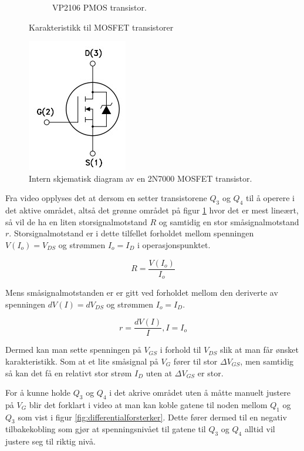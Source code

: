 \begin{figure}[H]
\begin{subfigure}{.5\textwidth}
		\caption{VP2106 PMOS transistor.\cite{supertex_2013_supertex}}
		\label{fig:karakteristikkting2}
	\end{subfigure}
	\caption{Karakteristikk til MOSFET transistorer}
	\label{fig:karakteristikker}
\end{figure}

\begin{figure}[H]
	\centering
	\includegraphics[scale=0.6]{./Images/02Concept/internal.jpg}
	\caption{Intern skjematisk diagram av en 2N7000 MOSFET transistor.\cite{stmicroelectronics_2008_2n7000}}
	\label{fig:internal}
\end{figure}

Fra video \cite{feyling_2022_aktiv} opplyses det at dersom en setter transistorene $Q_3$ og $Q_4$ til å operere i det aktive området, altså det grønne området på figur \ref{fig:karakteristikkting2} hvor det er mest lineært, så vil de ha en liten storsignalmotstand $R$ og samtidig en stor småsignalmotstand $r$. Storsignalmotstand er i dette tilfellet forholdet mellom spenningen $V(I_o)=V_{DS}$ og strømmen $I_o=I_D$ i operasjonspunktet.

\begin{equation}
	R=\frac{V(I_o)}{I_o}
\end{equation}

Mens småsignalmotstanden er er gitt ved forholdet mellom den deriverte av spenningen $dV(I)=dV_{DS}$ og strømmen $I_o=I_D$.

\begin{equation}
	r=\frac{dV(I)}{I}, I=I_o
\end{equation}

Dermed kan man sette spenningen på $V_{GS}$ i forhold til $V_{DS}$ slik at man får ønsket karakteristikk. Som at et lite småsignal på $V_G$ fører til stor $\Delta V_{GS}$, men samtidig så kan det få en relativt stor strøm $I_D$ uten at $\Delta V_{GS}$ er stor.


For å kunne holde $Q_3$ og $Q_4$ i det akrive området uten å måtte manuelt justere på $V_{G}$ blir det forklart i video \cite{feyling_2022_aktiv} at man kan koble gatene til noden mellom $Q_1$ og $Q_3$ som vist i figur \ref{fig:differentialforsterker}. Dette fører dermed til en negativ tilbakekobling som gjør at spenningsnivået til gatene til $Q_3$ og $Q_4$ alltid vil justere seg til riktig nivå.

